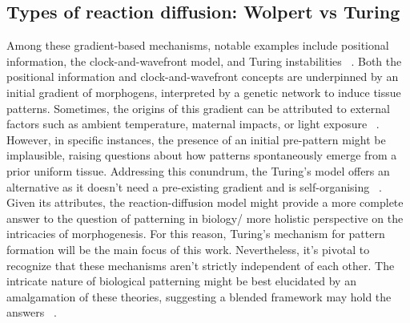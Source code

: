 \subsection{Types of reaction diffusion: Wolpert vs Turing}
Among these gradient-based mechanisms, notable examples include positional information, the clock-and-wavefront model, and Turing instabilities ~\parencite{Wolpert1969, Baker2006, Turing1952}.
Both the positional information and clock-and-wavefront concepts are underpinned by an initial gradient of morphogens, interpreted by a genetic network to induce tissue patterns.
Sometimes, the origins of this gradient can be attributed to external factors such as ambient temperature, maternal impacts, or light exposure ~\parencite{Schier2009}.
However, in specific instances, the presence of an initial pre-pattern might be implausible, raising questions about how patterns spontaneously emerge from a prior uniform tissue.
Addressing this conundrum, the Turing's model offers an alternative as it doesn't need a pre-existing gradient and is self-organising ~\parencite{Kondo2010a}. %
Given its attributes, the reaction-diffusion model might provide a more complete answer to the question of patterning in biology/ more holistic perspective on the intricacies of morphogenesis.
For this reason, Turing's mechanism for pattern formation will be the main focus of this work.
Nevertheless, it's pivotal to recognize that these mechanisms aren't strictly independent of each other.
The intricate nature of biological patterning might be best elucidated by an amalgamation of these theories, suggesting a blended framework may hold the answers ~\parencite{Green2015}. %
